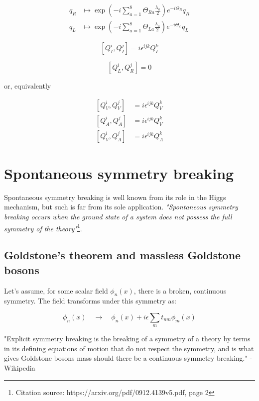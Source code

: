 \documentclass[10pt]{report}
\begin{document}
	\begin{align}
		q_R &\mapsto \exp\left( -i\sum_{a=1}^8 \Theta_{Ra}\frac{\lambda_a}{2} \right)e^{-i\Theta_R}q_R \\
		q_L &\mapsto \exp\left( -i\sum_{a=1}^8 \Theta_{La}\frac{\lambda_a}{2} \right)e^{-i\Theta_L}q_L
	\end{align}
	
	
	
	\begin{equation}
		\left[Q_I^i, Q_I^j\right] = i\epsilon^{ijk}Q_I^k
	\end{equation}
	
	\begin{equation}
		\left[Q_L^i, Q_R^j\right] = 0
	\end{equation}
	
	or, equivalently
	
	\begin{align}
	\left[Q_V^i, Q_V^j\right] &= i\epsilon^{ijk}Q_V^k \\
	\left[Q_A^i, Q_A^j\right] &= i\epsilon^{ijk}Q_V^k \\
	\left[Q_V^i, Q_A^j\right] &= i\epsilon^{ijk}Q_A^k 
	\end{align}
	
	\section{Spontaneous symmetry breaking}
	Spontaneous symmetry breaking is well known from its role in the Higgs mechanism, but such is far from its sole application. \emph{"Spontaneous symmetry breaking occurs when the ground state of a system does not possess the full symmetry of the theory"}\footnote{Citation source: https://arxiv.org/pdf/0912.4139v5.pdf, page 2}.
	
	
	\subsection{Goldstone's theorem and massless Goldstone bosons}
	Let's assume, for some scalar field $\phi_n(x)$, there is a broken, continuous symmetry. The field transforms under this symmetry as:
	
	\begin{equation}
		\phi_n(x) \quad \rightarrow \quad \phi_n(x) + i\epsilon\sum_m t_{nm}\phi_m(x)
	\end{equation}
	
	"Explicit symmetry breaking is the breaking of a symmetry of a theory by terms in its defining equations of motion that do not respect the symmetry, and is what gives Goldstone bosons mass should there be a continuous symmetry breaking." -Wikipedia
	
\end{document}
